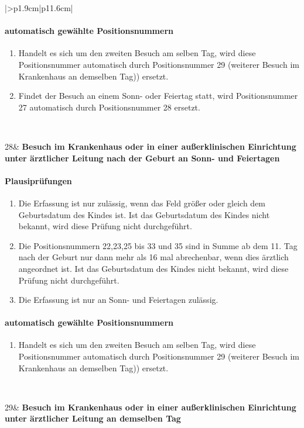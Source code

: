 \begin{mpsupertabular}{|>{\centering}p{1.9cm}|p{11.6cm}|}
\paragraph{automatisch gewählte Positionsnummern}
\begin{enumerate}
\item
Handelt es sich um den zweiten Besuch am selben Tag, wird diese 
Positionsnummer automatisch durch Positionsnummer 29
(weiterer Besuch im Krankenhaus an demselben Tag))
ersetzt.
\item
Findet der Besuch an einem Sonn- oder Feiertag statt, wird 
Positionsnummer 27 automatisch durch Positionsnummer 28 ersetzt.
\end{enumerate}
\\ \hline


28&
\textbf{Besuch im Krankenhaus oder in einer außerklinischen Einrichtung
unter ärztlicher Leitung nach der Geburt an Sonn- und Feiertagen}
\paragraph{Plausiprüfungen}
\begin{enumerate}
\item
Die Erfassung ist nur zulässig, wenn das Feld  größer 
oder gleich dem Geburtsdatum des Kindes ist. Ist das Geburtsdatum des
Kindes nicht bekannt, wird diese Prüfung nicht durchgeführt.
\item
Die Positionsnummern 22,23,25 bis 33 und 35 sind in Summe ab dem 11. Tag 
nach der Geburt nur dann mehr 
als 16 mal abrechenbar, wenn dies ärztlich angeordnet ist.
 Ist das Geburtsdatum des
Kindes nicht bekannt, wird diese Prüfung nicht durchgeführt.
\item
Die Erfassung ist nur an Sonn- und Feiertagen zulässig.
\end{enumerate}
\paragraph{automatisch gewählte Positionsnummern}
\begin{enumerate}
\item
Handelt es sich um den zweiten Besuch am selben Tag, wird diese 
Positionsnummer automatisch durch Positionsnummer 29
(weiterer Besuch im Krankenhaus an demselben Tag))
ersetzt.
\end{enumerate}
\\ \hline


29&
\textbf{Besuch im Krankenhaus oder in einer außerklinischen Einrichtung
unter ärztlicher Leitung an demselben Tag}

\end{mpsupertabular}

